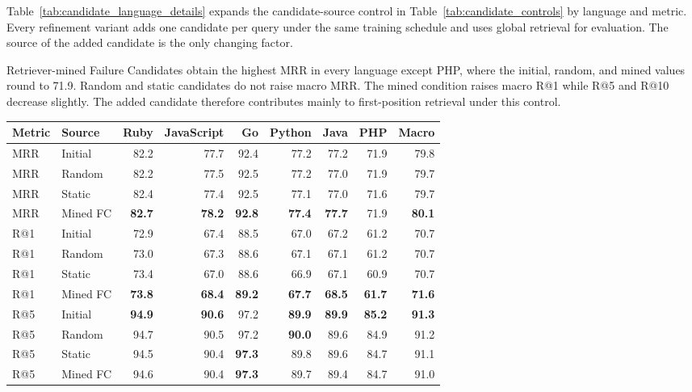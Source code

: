 \documentclass[11pt]{article}
\begin{document}
Table~\ref{tab:candidate_language_details} expands the candidate-source control in Table~\ref{tab:candidate_controls} by language and metric. Every refinement variant adds one candidate per query under the same training schedule and uses global retrieval for evaluation. The source of the added candidate is the only changing factor.

Retriever-mined Failure Candidates obtain the highest MRR in every language except PHP, where the initial, random, and mined values round to 71.9. Random and static candidates do not raise macro MRR. The mined condition raises macro R@1 while R@5 and R@10 decrease slightly. The added candidate therefore contributes mainly to first-position retrieval under this control.

\begin{table}[!t]
  \centering
  \scriptsize
  \setlength{\tabcolsep}{3.5pt}
  \begin{tabular}{llrrrrrrr}
    \toprule
    Metric & Source & Ruby & JavaScript & Go & Python & Java & PHP & Macro \\
    \midrule
    MRR & Initial & 82.2 & 77.7 & 92.4 & 77.2 & 77.2 & 71.9 & 79.8 \\
    MRR & Random & 82.2 & 77.5 & 92.5 & 77.2 & 77.0 & 71.9 & 79.7 \\
    MRR & Static & 82.4 & 77.4 & 92.5 & 77.1 & 77.0 & 71.6 & 79.7 \\
    MRR & Mined FC & \textbf{82.7} & \textbf{78.2} & \textbf{92.8} & \textbf{77.4} & \textbf{77.7} & 71.9 & \textbf{80.1} \\
    R@1 & Initial & 72.9 & 67.4 & 88.5 & 67.0 & 67.2 & 61.2 & 70.7 \\
    R@1 & Random & 73.0 & 67.3 & 88.6 & 67.1 & 67.1 & 61.2 & 70.7 \\
    R@1 & Static & 73.4 & 67.0 & 88.6 & 66.9 & 67.1 & 60.9 & 70.7 \\
    R@1 & Mined FC & \textbf{73.8} & \textbf{68.4} & \textbf{89.2} & \textbf{67.7} & \textbf{68.5} & \textbf{61.7} & \textbf{71.6} \\
    R@5 & Initial & \textbf{94.9} & \textbf{90.6} & 97.2 & \textbf{89.9} & \textbf{89.9} & \textbf{85.2} & \textbf{91.3} \\
    R@5 & Random & 94.7 & 90.5 & 97.2 & \textbf{90.0} & 89.6 & 84.9 & 91.2 \\
    R@5 & Static & 94.5 & 90.4 & \textbf{97.3} & 89.8 & 89.6 & 84.7 & 91.1 \\
    R@5 & Mined FC & 94.6 & 90.4 & \textbf{97.3} & 89.7 & 89.4 & 84.7 & 91.0 \\

\end{tabular}
\end{table}
\end{document}
